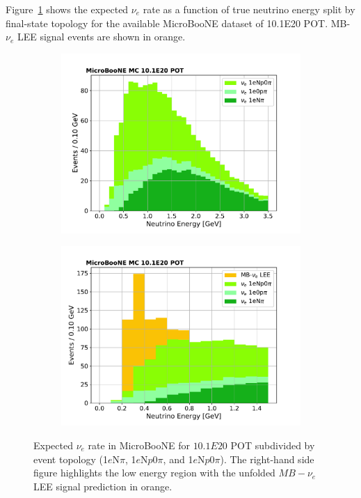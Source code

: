 \par Figure~\ref{fig:nuerate} shows the expected $\nu_e$ rate as a function of true neutrino energy split by final-state topology for the available MicroBooNE dataset of 10.1E20 POT. %
 MB-$\nu_e$ LEE signal events are shown in orange.
\begin{figure}[H] 
\begin{center}
    \begin{subfigure}[b]{0.45\textwidth}
    \centering
    \includegraphics[width=1.00\textwidth]{introduction/nue_rate_MCC9.pdf}
    \end{subfigure}
    \begin{subfigure}[b]{0.45\textwidth}
    \centering
    \includegraphics[width=1.00\textwidth]{introduction/nue_rate_MCC9_LEE.pdf}
    \end{subfigure}
\caption{\label{fig:nuerate}Expected $\nu_e$ rate in MicroBooNE for $10.1E20$ POT %
 subdivided by event topology (1$e$N$\pi$, 1$e$N$p$0$\pi$, and 1$e$N$p$0$\pi$). The right-hand side figure highlights the low energy region with the unfolded $MB-\nu_e$ LEE signal prediction in orange.}
\end{center}
\end{figure}

